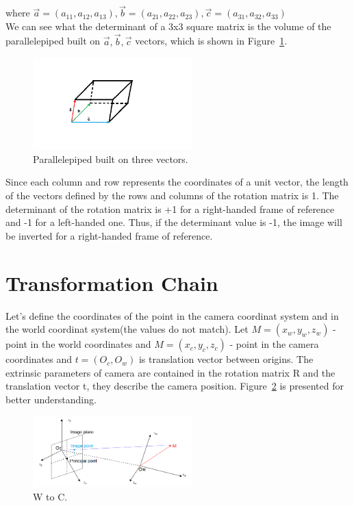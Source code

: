 \documentclass[a4paper, twoside, english]{article}
\begin{document}
{where $\vec{a} = (	a_{11}, a_{12}, a_{13}), \vec{b} = (	a_{21}, a_{22}, a_{23}), \vec{c} = (	a_{31}, a_{32}, a_{33})$\\
We can see what the determinant of a 3x3 square matrix is the volume of the parallelepiped built on $\vec{a},\vec{b},\vec{c}$ vectors, which is shown in Figure~\ref{fig:Pararll}.

\begin{figure}[h!]
	\centerline{\includegraphics[width=0.55\textwidth]{Parall.png}}
	\caption[Parallelepiped built on three vectors]{Parallelepiped built on three vectors.}
	\label{fig:Pararll}
\end{figure}

Since each column and row represents the coordinates of a unit vector, the length of the vectors defined by the rows and columns of the rotation matrix is 1. The determinant of the rotation matrix is +1 for a right-handed frame of reference and -1 for a left-handed one. Thus, if the determinant value is -1, the image will be inverted for a right-handed frame of reference.\\

\section{Transformation Chain}

Let's define the coordinates of the point in the camera coordinat system and in the world coordinat system(the values do not match). Let $M=(x_w,y_w,z_w)$ - point in the world coordinates and $M=(x_c,y_c,z_c)$ - point in the camera coordinates and $t= (O_c, O_w)$ is translation vector between origins. The extrinsic parameters of camera are contained in the rotation matrix R and the translation vector t, they describe the camera position. Figure~\ref{fig:WtoC} is presented for better understanding.


\begin{figure}[h!]
	\centerline{\includegraphics[width=0.55\textwidth]{WtoC.png}}
	\caption[WtoC]{W to C.}
	\label{fig:WtoC}
\end{figure}


}
\end{document}
